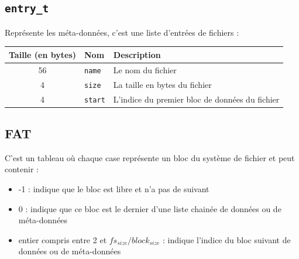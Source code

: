 \documentclass[a4paper, 12pt]{article}
\begin{document}
\subsection{\texttt{entry_t}} Représente les méta-données, c'est une liste d'entrées de fichiers :

\begin{tabular}{|c|l|p{.5\linewidth}|}	\hline
	\textbf{Taille (en bytes)}	& \textbf{Nom} & \textbf{Description} \\ \hline
	56	& \texttt{name} 	& Le nom du fichier \\ \hline
	4 	& \texttt{size} 	& La taille en bytes du fichier \\ \hline
	4 	& \texttt{start} & L'indice du premier bloc de données du fichier \\ \hline
\end{tabular}

\newpage
\subsection{FAT} C'est un tableau où chaque case représente un bloc du système de fichier et peut contenir :
\begin{itemize}
	\item -1 : indique que le bloc est libre et n'a pas de suivant
	\item 0 : indique que ce bloc est le dernier d'une liste chainée de données ou de méta-données
	\item entier compris entre 2 et $fs_{size} / block_{size}$ : indique l'indice du bloc suivant de données ou de méta-données
\end{itemize}
\end{document}
